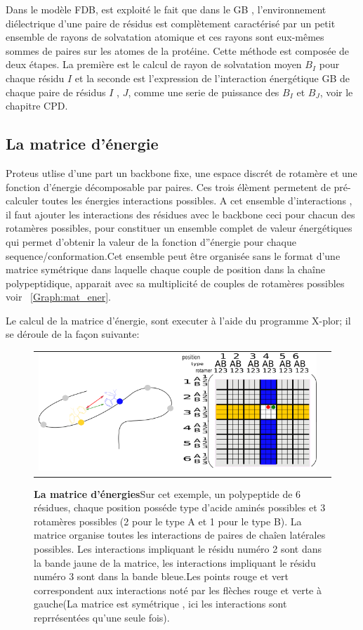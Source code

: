 Dans le modèle FDB, est exploité le fait que dans le GB , l'environnement diélectrique d'une paire de résidus est complètement caractérisé par un petit ensemble de rayons de solvatation atomique et ces rayons sont eux-mêmes sommes de paires sur les atomes de la protéine. Cette méthode est composée de deux étapes. La première est le calcul de rayon de solvatation moyen $B_I$ pour chaque résidu $I$ et la seconde est l'expression de l'interaction énergétique GB de chaque paire de résidus $I$ , $J$, comme une serie de puissance des  $B_I$  et $B_J$, voir le chapitre CPD. 


\subsection{La matrice d'énergie}

Proteus utlise d'une part un backbone fixe, une espace discrét de rotamère et une fonction d'énergie décomposable par paires. Ces trois élèment permetent de pré-calculer toutes les énergies interactions possibles. A cet ensemble d'interactions , il faut ajouter les interactions des résidues avec le backbone ceci pour chacun des rotamères possibles, pour constituer un ensemble complet de valeur énergétiques qui permet d'obtenir la valeur de la fonction d''énergie pour chaque sequence/conformation.Cet ensemble peut être organisée sans le format d'une matrice symétrique dans laquelle chaque couple de position dans la chaîne polypeptidique, apparait avec sa multiplicité de couples de rotamères possibles voir ~\ref{Graph:mat_ener}.      

Le calcul de la matrice d'énergie, sont executer à l'aide du programme X-plor; il se déroule de la façon suivante:


   \begin{figure}[t]
     \centering
     \begin{tabular}{cc}
       \includegraphics[width=12cm]{graphe/proteus/matrice.png} &
     \end{tabular}
     
     \caption{\textbf{La matrice d'énergies}Sur cet exemple, un polypeptide de 6 résidues, chaque position posséde type d'acide aminés possibles et 3 rotamères possibles (2 pour le type A et 1 pour le type B). La matrice organise toutes les interactions de paires de chaîen latérales possibles. Les interactions impliquant le résidu numéro 2 sont dans la bande jaune de la matrice, les interactions impliquant le résidu numéro 3 sont dans la bande bleue.Les points rouge et vert correspondent aux interactions  noté par les flèches rouge et verte à gauche(La matrice est symétrique , ici les interactions sont reprrésentées qu'une seule fois).}
\label{graph:MAt_ener}
   \end{figure}
   

